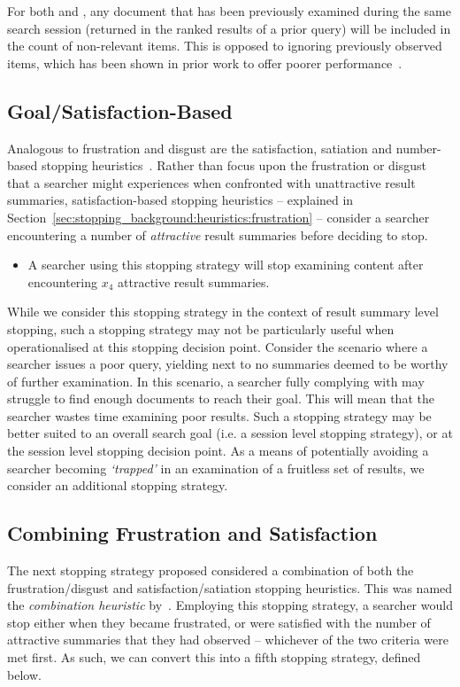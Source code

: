 For both  and , any document that has been previously examined during the same search session (returned in the ranked results of a prior query) will be included in the count of non-relevant items. This is opposed to ignoring previously observed items, which has been shown in prior work to offer poorer performance~\cite{maxwell2015stopping_strategies}.

\subsection{Goal/Satisfaction-Based}
Analogous to frustration and disgust are the satisfaction, satiation and number-based stopping heuristics~\citep{cooper1973retrieval_effectiveness_ii, simon1955satiation, gibb1958number_rule}. Rather than focus upon the frustration or disgust that a searcher might experiences when confronted with unattractive result summaries, satisfaction-based stopping heuristics -- explained in Section~\ref{sec:stopping_background:heuristics:frustration} -- consider a searcher encountering a number of \emph{attractive} result summaries before deciding to stop.

\begin{itemize}
    \item{ A searcher using this stopping strategy will stop examining content after encountering $x_4$ attractive result summaries.}
\end{itemize}

While we consider this stopping strategy in the context of result summary level stopping, such a stopping strategy may not be particularly useful when operationalised at this stopping decision point. Consider the scenario where a searcher issues a poor query, yielding next to no summaries deemed to be worthy of further examination. In this scenario, a searcher fully complying with  may struggle to find enough documents to reach their goal. This will mean that the searcher wastes time examining poor results. Such a stopping strategy may be better suited to an overall search goal (i.e. a session level stopping strategy), or at the session level stopping decision point. As a means of potentially avoiding a searcher becoming \emph{`trapped'} in an examination of a fruitless set of results, we consider an additional stopping strategy.

\subsection{Combining Frustration and Satisfaction}
The next stopping strategy proposed considered a combination of both the frustration/disgust and satisfaction/satiation stopping heuristics. This was named the \emph{combination heuristic} by~\cite{kraft1979stopping_rules}. Employing this stopping strategy, a searcher would stop either when they became frustrated, or were satisfied with the number of attractive summaries that they had observed -- whichever of the two criteria were met first. As such, we can convert this into a fifth stopping strategy, defined below.


